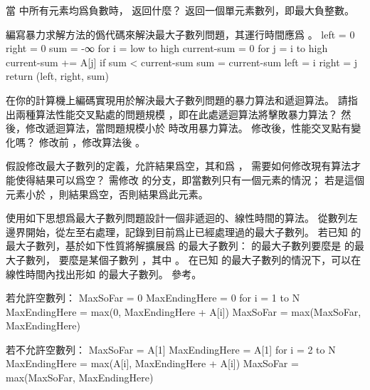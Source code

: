 \startsection[
  title={The maximum-subarray problem},
]

\startEXERCISE
當  中所有元素均爲負數時，  返回什麼？
\stopEXERCISE
\startANSWER
返回一個單元素數列，即最大負整數。
\stopANSWER

\startEXERCISE
編寫暴力求解方法的僞代碼來解決最大子數列問題，其運行時間應爲 。
\stopEXERCISE
\startANSWER
{}
\startCLRS
left = 0
right = 0
sum = -∞
for i = low to high
	current-sum = 0
	for j = i to high
	current-sum += A[j]
	if sum < current-sum
		sum = current-sum
	left = i
	right = j
return (left, right, sum)
\stopCLRS
\stopANSWER

\startEXERCISE
在你的計算機上編碼實現用於解決最大子數列問題的暴力算法和遞迴算法。
請指出兩種算法性能交叉點處的問題規模  ，即在此處遞迴算法將擊敗暴力算法？
然後，修改遞迴算法，當問題規模小於  時改用暴力算法。
修改後，性能交叉點有變化嗎？
\stopEXERCISE
\startANSWER
修改前 ，修改算法後 。
\stopANSWER

\startEXERCISE
假設修改最大子數列的定義，允許結果爲空，其和爲 ，
需要如何修改現有算法才能使得結果可以爲空？
\stopEXERCISE
\startANSWER
需修改  的分支，即當數列只有一個元素的情況；
若是這個元素小於 ，則結果爲空，否則結果爲此元素。
\stopANSWER

\startEXERCISE
使用如下思想爲最大子數列問題設計一個非遞迴的、線性時間的算法。
從數列左邊界開始，從左至右處理，記錄到目前爲止已經處理過的最大子數列。
若已知 的最大子數列，基於如下性質將解擴展爲  的最大子數列：
 的最大子數列要麼是  的最大子數列，
要麼是某個子數列 ，其中 。
在已知  的最大子數列的情況下，可以在線性時間內找出形如  的最大子數列。
\stopEXERCISE
\startANSWER
參考。

若允許空數列：
\startCLRS
MaxSoFar = 0
MaxEndingHere = 0
for i = 1 to N
	MaxEndingHere = max(0, MaxEndingHere + A[i])
	MaxSoFar = max(MaxSoFar, MaxEndingHere)
\stopCLRS

若不允許空數列：
\startCLRS
MaxSoFar = A[1]
MaxEndingHere = A[1]
for i = 2 to N
	MaxEndingHere = max(A[i], MaxEndingHere + A[i])
	MaxSoFar = max(MaxSoFar, MaxEndingHere)
\stopCLRS
\stopANSWER

\stopsection
